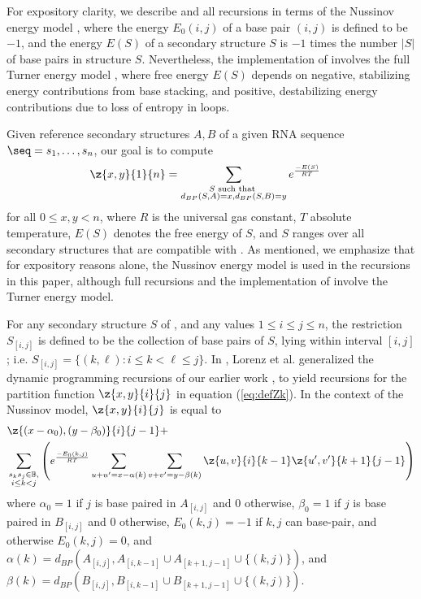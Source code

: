 For expository clarity, we describe \ffttwo and all recursions
in terms of the Nussinov energy model \citep{nussinovJacobson}, where
the energy $E_0(i,j)$ of a base pair $(i,j)$ is defined to be $-1$, and the
energy $E(S)$ of a secondary structure $S$ is $-1$ times the number $|S|$
of base pairs in structure $S$.  Nevertheless, the implementation of
\ffttwo involves the full Turner energy model \citep{xia:RNA}, where
free energy $E(S)$ depends on negative, stabilizing energy contributions
from base stacking, and positive, destabilizing energy contributions due to
loss of entropy in loops.

Given reference secondary structures $A,B$ of a
given RNA sequence $\seq=s_1,\ldots,s_n$, our goal is to compute
\begin{align}
\label{eq:defZk}
\z{x,y}{1}{n} &= \sum_{\substack{S \text{ such that }\\
d_{BP}(S,A)=x, d_{BP}(S,B)=y}} e^{\frac{-E(S)}{RT}}
\end{align}
for all $0\leq x,y < n$, where $R$ is the universal gas constant, $T$
absolute temperature, $E(S)$ denotes the free energy of $S$, and $S$ ranges
over all secondary structures that are compatible with \seq. As mentioned,
we emphasize that for expository reasons alone, the Nussinov energy model is
used in the recursions in this paper, although full recursions and
the implementation of \ffttwo involve the Turner energy model.

For any secondary structure $S$ of \seq, and any values
$1\leq i\leq j \leq n$, the restriction $S_{[i,j]}$ is defined to be the
collection of base pairs of $S$, lying within interval $[i,j]$; i.e.
$S_{[i,j]} = \{ (k,\ell) : i \leq k < \ell \leq j\}$.
In \citep{hofacker:RNAbor2D}, Lorenz et al. generalized
the dynamic programming recursions of our earlier work \citep{Freyhult.b07},
to yield recursions
for the partition function $\z{x,y}{i}{j}$ in equation
(\ref{eq:defZk}).  In the context of the Nussinov model,
$\z{x,y}{i}{j}$ is equal to
\begin{eqnarray}
\label{eq:RNAborNussRecursion}
&\z{(x-\alpha_0),(y-\beta_0)}{i}{j-1} +  \\
&\sum_{\substack{s_k s_j \in \mathbb{B},\\i\le k<j}}
\left(e^{\frac{-E_0(k,j)}{RT}}
\sum_{u+u'=x-\alpha(k)} \sum_{v+v'=y-\beta(k)}
\z{u,v}{i}{k-1}  \z{u',v'}{k+1}{j-1} \right) \nonumber
\end{eqnarray}
where $\alpha_0 = 1$ if $j$ is base paired in $A_{[i,j]}$ and $0$ otherwise,
$\beta_0 = 1$ if $j$ is base paired in $B_{[i,j]}$ and $0$ otherwise,
$E_0(k,j)=-1$ if $k,j$ can base-pair, and otherwise $E_0(k,j)=0$, and
$\alpha(k)=d_{BP}(A_{[i,j]}, A_{[i,k-1]} \cup A_{[k+1,j-1]} \cup\{(k,j)\})$,
and
$\beta(k)=d_{BP}(B_{[i,j]}, B_{[i,k-1]} \cup B_{[k+1,j-1]} \cup\{(k,j)\})$.

